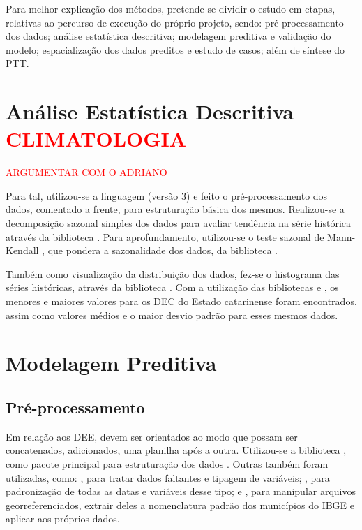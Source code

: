 \indent Para melhor explicação dos métodos, pretende-se dividir o estudo em etapas, relativas ao percurso de execução do próprio projeto, sendo: pré-processamento dos dados; análise estatística descritiva; modelagem preditiva e validação do modelo; espacialização dos dados preditos e estudo de casos; além de síntese do \acrfull{PTT}.


\section{Análise Estatística Descritiva \textcolor{red}{CLIMATOLOGIA}}

\indent \textcolor{red}{ARGUMENTAR COM O ADRIANO}

\indent Para tal, utilizou-se a linguagem  (versão 3) \cite{python3_2009_van} e feito o pré-processamento dos dados, comentado a frente, para estruturação básica dos mesmos. Realizou-se a decomposição sazonal simples dos dados para avaliar tendência na série histórica através da biblioteca  \cite{statsmodels_2010_seabold}. Para aprofundamento, utilizou-se o teste sazonal de Mann-Kendall , que pondera a sazonalidade dos dados, da biblioteca  \cite{pyMannKendall_2019_Hussain}.

\indent Também como visualização da distribuição dos dados, fez-se o histograma das séries históricas, através da biblioteca  \cite{matplotlib_2007_hunter}. Com a utilização das bibliotecas  \cite{pandas_2010_scipy, pandas_2020_reback} e  \cite{numpy_2020_harrisarray}, os menores e maiores valores para os \acrshort{DEC} do Estado catarinense foram encontrados, assim como valores médios e o maior desvio padrão para esses mesmos dados.

\section{Modelagem Preditiva}

\subsection{Pré-processamento}

Em relação aos \acrshort{DEE}, devem ser orientados ao modo que possam ser concatenados, adicionados, uma planilha após a outra. Utilizou-se a biblioteca , como pacote principal para estruturação dos dados . Outras também foram utilizadas, como: , para tratar dados faltantes e tipagem de variáveis;  \cite{python2_1995_van}, para padronização de todas as datas e variáveis desse tipo; e  \cite{geopandas_2020_kelseyjordahl}, para manipular arquivos georreferenciados, extrair deles a nomenclatura padrão dos municípios do \acrshort{IBGE} e aplicar aos próprios dados.

